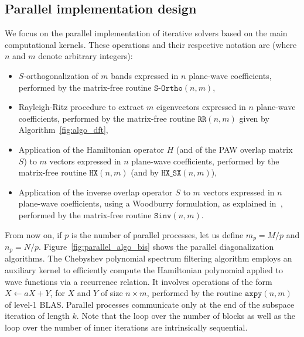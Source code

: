 \documentclass[twocolumn,superscriptaddress]{revtex4-1}
\begin{document}
\subsection{Parallel implementation design}\label{sec:paral_design}
We focus on the parallel implementation of iterative solvers based on the main computational kernels. These operations and their respective notation are (where $n$ and $m$ denote arbitrary integers): 
\begin{itemize}
    \item $S$-orthogonalization of $m$ bands expressed in $n$ plane-wave coefficients, performed by the matrix-free routine $\texttt{S-Ortho}(n,m)$, 
    \item Rayleigh-Ritz procedure to extract $m$ eigenvectors expressed in $n$ plane-wave coefficients, performed by the matrix-free routine $\texttt{RR}(n,m)$ given by Algorithm~\ref{fig:algo_dft},
    \item Application of the Hamiltonian operator $H$ (and of the PAW overlap matrix $S$) to $m$ vectors expressed in $n$ plane-wave coefficients, performed by the matrix-free routine $\texttt{HX}(n,m)$ (and by $\texttt{HX\_SX}(n,m)$),
    \item Application of the inverse overlap operator $S$ to $m$ vectors expressed in $n$ plane-wave coefficients, using a Woodburry formulation, as explained in~\cite{LEVITT201598}, performed by the matrix-free routine $\texttt{Sinv}(n,m)$.
\end{itemize}

From now on, if $p$ is the number of parallel processes, let us define $m_p=M/p$ and $n_p=N/p$. Figure~\ref{fig:parallel_algo_bis} shows the parallel diagonalization algorithms. The Chebyshev polynomial spectrum filtering algorithm employs an auxiliary kernel to efficiently compute the Hamiltonian polynomial applied to wave functions via a recurrence relation. It involves operations of the form $X\gets aX + Y$, for $X$ and $Y$ of size $n\times m$, performed by the routine $\texttt{axpy}(n,m)$ of level-1 BLAS. Parallel processes communicate only at the end of the subspace iteration of length $k$. Note that the loop over the number of blocks as well as the loop over the number of inner iterations are intrinsically sequential. 
\end{document}
